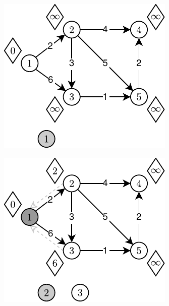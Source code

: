\begin{figure}[!htbp]
	\centering
	\null\hfill
	\begin{subfigure}[b]{0.3\textwidth}
		\includegraphics[width=\textwidth]{Chapter_III/GRAPH-GROWTH-2Q-Example/a.pdf}
		\caption{}
		\label{fig:exampleDQQ:a}
	\end{subfigure}
	\hfill
	\begin{subfigure}[b]{0.3\textwidth}
		\includegraphics[width=\textwidth]{Chapter_III/GRAPH-GROWTH-2Q-Example/b.pdf}

\end{subfigure}
\end{figure}
